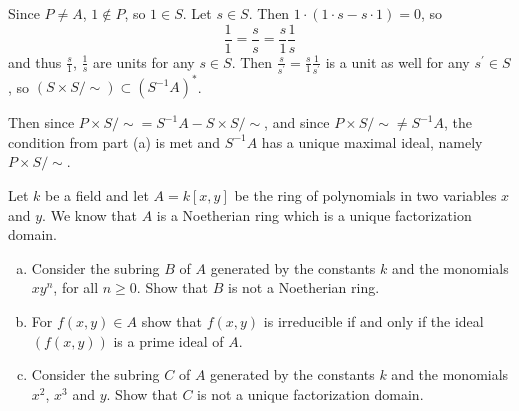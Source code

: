 \documentclass{article}
\newcounter{Problem}
\newenvironment{Problem}{\begin{Exercise}[name={Problem},
                                          counter={Problem}]}
                        {\end{Exercise}}
\begin{document}
\begin{Answer}
\begin{enumerate}[(a)]
{      Since $P \neq A$, $1 \notin P$, so $1 \in S$.
      Let $s \in S$. Then $1 \cdot (1 \cdot s - s \cdot 1) = 0$, so
       $$
       \frac{1}{1} = \frac{s}{s} = \frac{s}{1}\frac{1}{s}
       $$
      and thus $\frac{s}{1}$, $\frac{1}{s}$ are units for any $s \in
      S$. Then
      $
      \frac{s}{s^\prime} = \frac{s}{1}\frac{1}{s^\prime}
      $
      is a unit as well for any $s^\prime \in S$, so
      $(S \times S / \sim) \subset (S^{-1}A)^\ast$.

      Then since $P \times S / \sim = S^{-1} A - S \times S / \sim$,
      and since $P \times S / \sim \neq S^{-1} A$, the condition from
      part (a) is met and $S^{-1} A$ has a unique maximal ideal, namely
      $P \times S / \sim$.
    }

  \end{enumerate}
\end{Answer}

\pagebreak

\begin{Problem}
  Let $k$ be a field and let $A = k[x, y]$ be the ring of polynomials in
  two variables $x$ and $y$. We know that $A$ is a Noetherian ring which
  is a unique factorization domain.
  \begin{enumerate}[(a)]
    \item{
      Consider the subring $B$ of $A$ generated by the constants $k$
      and the monomials $xy^n$, for all $n \geq 0$. Show that $B$ is
      not a Noetherian ring.
    }
    \item{
      For $f(x, y) \in A$ show that $f(x, y)$ is irreducible if and
      only if the ideal $(f(x,y))$ is a prime ideal of $A$.
    }
    \item{
      Consider the subring $C$ of $A$ generated by the constants $k$
      and the monomials $x^2$, $x^3$ and $y$. Show that $C$ is not a
      unique factorization domain.
    }
  \end{enumerate}
\end{Problem}
\end{document}
